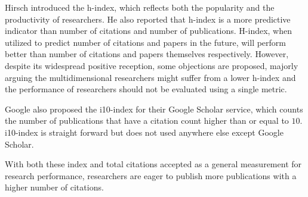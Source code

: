Hirsch introduced the h-index, which reflects both the popularity and the productivity of researchers\cite{hirsch2005index}. He also reported that h-index is a more predictive indicator than number of citations and number of publications. H-index, when utilized to predict number of citations and papers in the future, will perform better than number of citations and papers themselves respectively\cite{hirsch2007does}. However, despite its widespread positive reception, some objections are proposed, majorly arguing the multidimensional researchers might suffer from a lower h-index and the performance of researchers should not be evaluated using a single metric\cite{van2006comparison,glanzel2006h,glanzel2006opportunities}.

Google also proposed the i10-index for their Google Scholar service, which counts the number of publications that have a citation count higher than or equal to $10$. i10-index is straight forward but does not used anywhere else except Google Scholar.

With both these index and total citations accepted as a general measurement for research performance, researchers are eager to publish more publications with a higher number of citations.
